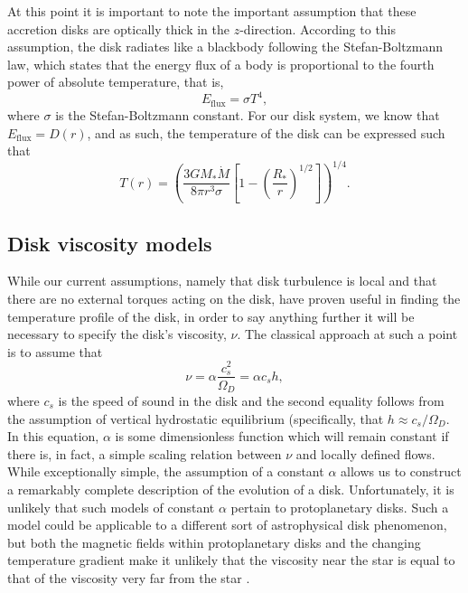 \documentclass[aps,pra,twocolumn]{revtex4-1}
\begin{document}
At this point it is important to note the important assumption that these accretion disks are optically thick in the $z$-direction.  According to this assumption, the disk radiates like a blackbody following the Stefan-Boltzmann law, which states that the energy flux of a body is proportional to the fourth power of absolute temperature, that is,
\begin{equation}
E_{\text{flux}} = \sigma T^4,
\end{equation}
where $\sigma$ is the Stefan-Boltzmann constant.  For our disk system, we know that $E_\text{flux} = D(r)$, and as such, the temperature of the disk can be expressed such that \cite{armitage2011, king2002}
\begin{equation}
T(r) = \left( \frac{3GM_*\dot{M}}{8\pi r^3 \sigma}\left[ 1 - \left( \frac{R_*}{r}\right)^{1/2}\right] \right)^{1/4}.
\end{equation}


\subsection{\label{section2.3} Disk viscosity models}
While our current assumptions, namely that disk turbulence is local and that there are no external torques acting on the disk, have proven useful in finding the temperature profile of the disk, in order to say anything further it will be necessary to specify the disk's viscosity, $\nu$.  The classical approach at such a point is to assume that
\begin{equation}
\nu = \alpha \frac{c_s^2}{\Omega_D} = \alpha c_s h , \label{nuRelation}
\end{equation}
where $c_s$ is the speed of sound in the disk and the second equality follows from the assumption of vertical hydrostatic equilibrium (specifically, that $h \approx c_s/\Omega_D$.  In this equation, $\alpha$ is some dimensionless function which will remain constant if there is, in fact, a simple scaling relation between $\nu$ and locally defined flows.  While exceptionally simple, the assumption of a constant $\alpha$ allows us to construct a remarkably complete description of the evolution of a disk.  Unfortunately, it is unlikely that such models of constant $\alpha$ pertain to protoplanetary disks. Such a model could be applicable to a different sort of astrophysical disk phenomenon, but both the magnetic fields within protoplanetary disks and the changing temperature gradient make it unlikely that the viscosity near the star is equal to that of the viscosity very far from the star \cite{armitage2011}.
\end{document}

